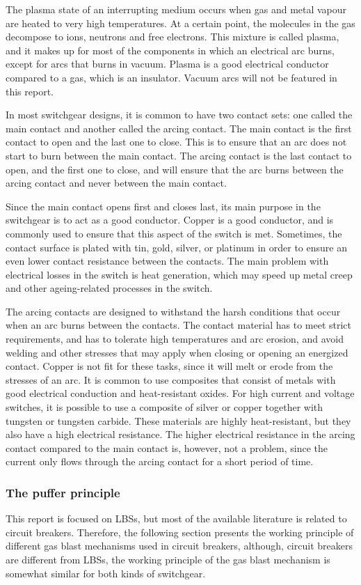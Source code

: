 \documentclass[10pt,b5paper,twoside]{article}
\begin{document}
The plasma state of an interrupting medium occurs when gas and metal vapour are heated to very high temperatures. At a certain point, the molecules in the gas decompose to ions, neutrons and free electrons. This mixture is called plasma, and it makes up for most of the components in which an electrical arc burns, except for arcs that burns in vacuum. Plasma is a good electrical conductor compared to a gas, which is an insulator. Vacuum arcs will not be featured in this report.

In most switchgear designs, it is common to have two contact sets: one called the main contact and another called the arcing contact. The main contact is the first contact to open and the last one to close. This is to ensure that an arc does not start to burn between the main contact. The arcing contact is the last contact to open, and the first one to close, and will ensure that the arc burns between the arcing contact and never between the main contact.

Since the main contact opens first and closes last, its main purpose in the switchgear is to act as a good conductor. Copper is a good conductor, and is commonly used to ensure that this aspect of the switch is met. Sometimes, the contact surface is plated with tin, gold, silver, or platinum in order to ensure an even lower contact resistance between the contacts. The main problem with electrical losses in the switch is heat generation, which may speed up metal creep and other ageing-related processes in the switch.

The arcing contacts are designed to withstand the harsh conditions that occur when an arc burns between the contacts. The contact material has to meet strict requirements, and has to tolerate high temperatures and arc erosion, and avoid welding and other stresses that may apply when closing or opening an energized contact. Copper is not fit for these tasks, since it will melt or erode from the stresses of an arc. It is common to use composites that consist of metals with good electrical conduction and heat-resistant oxides. For high current and voltage switches, it is possible to use a composite of silver or copper together with tungsten or tungsten carbide. These materials are highly heat-resistant, but they also have a high electrical resistance. The higher electrical resistance in the arcing contact compared to the main contact is, however, not a problem, since the current only flows through the arcing contact for a short period of time.

\subsubsection{The puffer principle} \label{sec:puffer}
This report is focused on LBSs, but most of the available literature is related to circuit breakers. Therefore, the following section presents the working principle of different gas blast mechanisms used in circuit breakers, although, circuit breakers are different from LBSs, the working principle of the gas blast mechanism is somewhat similar for both kinds of switchgear.
\end{document}
